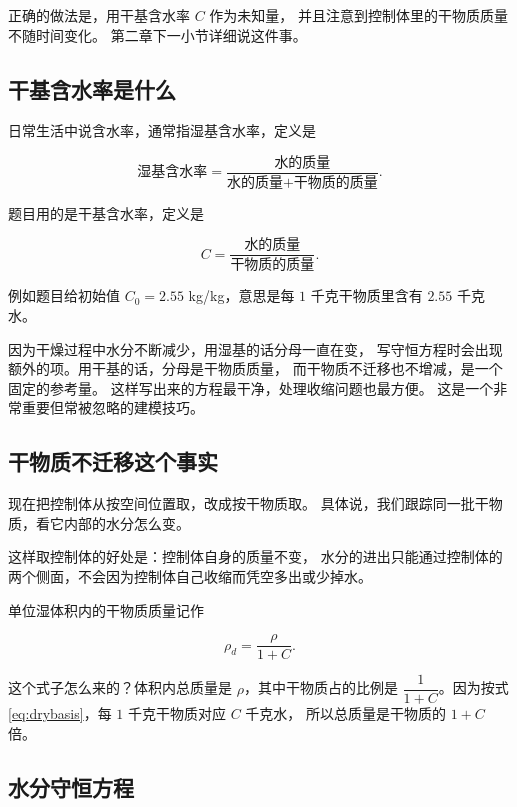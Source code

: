 正确的做法是，用干基含水率 $C$ 作为未知量，
并且注意到控制体里的干物质质量不随时间变化。
第二章下一小节详细说这件事。

\subsection{干基含水率是什么}

日常生活中说含水率，通常指湿基含水率，定义是

\begin{equation}
\text{湿基含水率} = \frac{\text{水的质量}}{\text{水的质量}+\text{干物质的质量}} .
\end{equation}

题目用的是干基含水率，定义是

\begin{equation}
C = \frac{\text{水的质量}}{\text{干物质的质量}} .
\label{eq:drybasis}
\end{equation}

例如题目给初始值 $C_0=2.55$ kg/kg，意思是每 $1$ 千克干物质里含有 $2.55$ 千克水。

因为干燥过程中水分不断减少，用湿基的话分母一直在变，
写守恒方程时会出现额外的项。用干基的话，分母是干物质质量，
而干物质不迁移也不增减，是一个固定的参考量。
这样写出来的方程最干净，处理收缩问题也最方便。
这是一个非常重要但常被忽略的建模技巧。

\subsection{干物质不迁移这个事实}

现在把控制体从按空间位置取，改成按干物质取。
具体说，我们跟踪同一批干物质，看它内部的水分怎么变。

这样取控制体的好处是：控制体自身的质量不变，
水分的进出只能通过控制体的两个侧面，不会因为控制体自己收缩而凭空多出或少掉水。

单位湿体积内的干物质质量记作

\begin{equation}
\rho_d = \frac{\rho}{1+C}.
\end{equation}

这个式子怎么来的？体积内总质量是 $\rho$，其中干物质占的比例是
$\dfrac{1}{1+C}$。因为按式 \eqref{eq:drybasis}，每 $1$ 千克干物质对应 $C$ 千克水，
所以总质量是干物质的 $1+C$ 倍。

\subsection{水分守恒方程}

